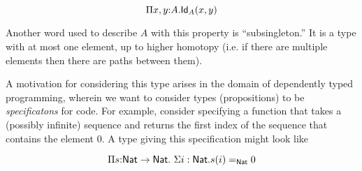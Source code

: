\documentclass[11pt]{article}
\begin{document}
\[
\Pi{x,y}{:}A.\mathsf{Id}_{A}(x,y)
\]

Another word used to describe $A$ with this property is ``subsingleton.''
It is a type with at most one element, up to higher homotopy (i.e. if there
are multiple elements then there are paths between them).

A motivation for considering this type arises in the domain of dependently
typed programming, wherein we want to consider types (propositions) to be
{\em specificatons} for code. For example, consider specifying a function
that takes a (possibly infinite) sequence and returns the first index of
the sequence that contains the element $0$. A type giving this
specification might look like

\[
\Pi{s{:}\mathsf{Nat}\to\mathsf{Nat}}.\ \Sigma{i:\mathsf{Nat}}.s(i)=_{\mathsf{Nat}} 0
\]
\end{document}
